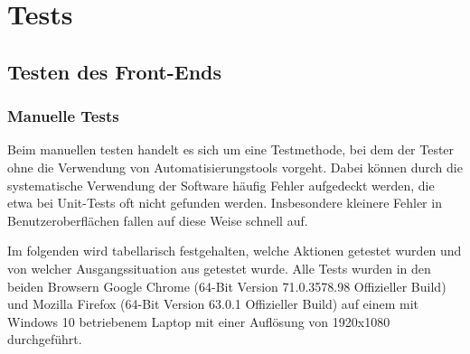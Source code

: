 \chapter{Tests}
\section{Testen des Front-Ends}
\subsection{Manuelle Tests}
Beim manuellen testen handelt es sich um eine Testmethode, bei dem der Tester ohne die Verwendung von Automatisierungstools vorgeht. Dabei können durch die systematische Verwendung der Software häufig Fehler aufgedeckt werden, die etwa bei Unit-Tests oft nicht gefunden werden. Insbesondere kleinere Fehler in Benutzeroberflächen fallen auf diese Weise schnell auf.

Im folgenden wird tabellarisch festgehalten, welche Aktionen getestet wurden und von welcher Ausgangssituation aus getestet wurde. Alle Tests wurden in den beiden Browsern Google Chrome (64-Bit Version 71.0.3578.98 Offizieller Build) und Mozilla Firefox (64-Bit Version 63.0.1 Offizieller Build) auf einem mit Windows 10 betriebenem Laptop mit einer Auflösung von 1920x1080 durchgeführt.